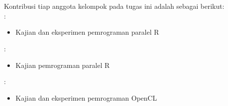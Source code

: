 \chapter{\kontribusi}
Kontribusi tiap anggota kelompok pada tugas ini adalah sebagai berikut: \\[8pt]

:
\begin{itemize}
	\item Kajian dan eksperimen pemrograman paralel R
\end{itemize}

:
\begin{itemize}
	\item Kajian pemrograman paralel R
\end{itemize}

:
\begin{itemize}
	\item Kajian dan eksperimen pemrograman OpenCL
\end{itemize}

